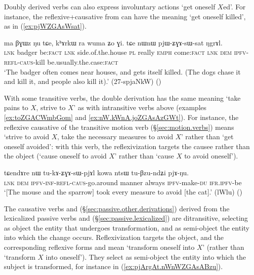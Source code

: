 Doubly derived verbs can also express involuntary actions `get oneself $X$ed'. For instance, the reflexive+causative  from  can have the meaning `get oneself killed', as in (\ref{ex:pjWZGAsWsat}).

\begin{exe}
\ex \label{ex:pjWZGAsWsat}
\gll ma βɣɯz ŋu tɕe, kʰɤrkɯ ra wuma ʑo ɣi. tɕe nɯnɯ pjɯ-ʑɣɤ-sɯ-sat ŋgrɤl. \\ 
\textsc{lnk} badger be:\textsc{fact} \textsc{lnk} side.of.the.house \textsc{pl} really \textsc{emph} come:\textsc{fact} \textsc{lnk} \textsc{dem} \textsc{ipfv}-\textsc{refl}-\textsc{caus}-kill be.usually.the.case:\textsc{fact} \\ 
\glt `The badger often comes near houses, and gets itself killed. (The dogs chase it and kill it, and people also kill it).' (27-spjaNkW)
()
\end{exe}

With some transitive verbs, the double derivation has the same meaning `take pains to $X$, strive to $X$' as with intransitive verbs above (examples \ref{ex:toZGACWmbGom} and \ref{ex:nW.kWnA.joZGAsAzGWt}). For instance, the reflexive causative  of the transitive motion verb  (§\ref{sec:motion.verbs}) means `strive to avoid $X$, take the necessary measures to avoid $X$' rather than `get oneself avoided': with this verb, the reflexivization targets the causee rather than the object (`cause oneself to avoid $X$' rather than `cause $X$ to avoid oneself').

\begin{exe}
\ex \label{ex:tukAZGAsWpjAl.kowa}
\gll tɕendɤre nɯ tu-kɤ-ʑɣɤ-sɯ-pjɤl kowa ntsɯ tu-βzu-ndʑi pjɤ-ŋu. \\
\textsc{lnk} \textsc{dem} \textsc{ipfv}-\textsc{inf}-\textsc{refl}-\textsc{caus}-go.around manner always \textsc{ipfv}-make-\textsc{du} \textsc{ifr}.\textsc{ipfv}-be \\
\glt `[The mouse and the sparrow] took every measure to avoid [the cat].' (lWlu)
()
\end{exe}


The causative verbs  and  (§\ref{sec:passive.other.derivations}) derived from the lexicalized passive verbs  and  (§\ref{sec:passive.lexicalized}) are ditransitive, selecting as object the entity that undergoes transformation, and as semi-object the entity into which the change occurs. Reflexivization targets the object, and the corresponding reflexive forms   and  mean `transform oneself into $X$' (rather than `transform $X$ into oneself'). They select as semi-object the entity into which the subject is transformed, for instance  in (\ref{ex:pjArgAt.nWnWZGAsABzu}).

